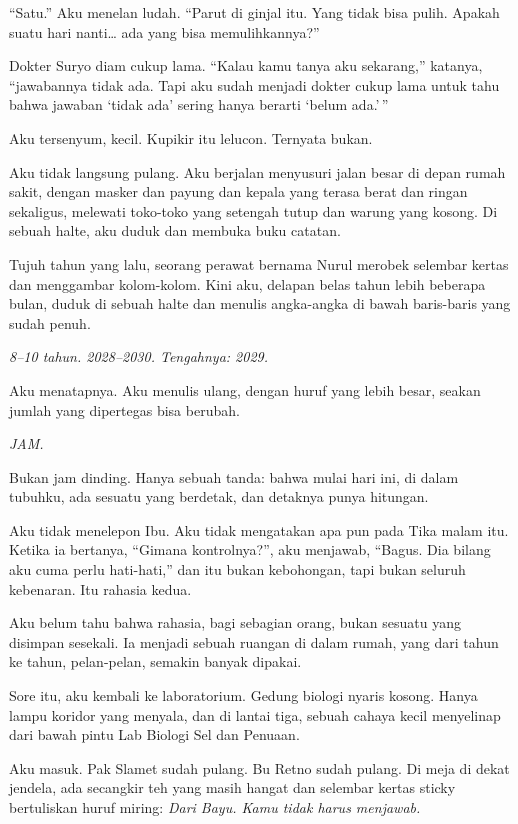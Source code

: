 \documentclass[11pt,twoside,openany]{book}
\makeatletter
\newcommand{\scenebreak}{\par\vspace{0.9em}{\centering\textsc{*\hspace{0.7em}*\hspace{0.7em}*}\par}\vspace{0.9em}\@afterindentfalse\@afterheading}
\makeatother
\begin{document}
``Satu.'' Aku menelan ludah. ``Parut di ginjal itu. Yang tidak bisa pulih. Apakah suatu hari nanti\ldots{} ada yang bisa memulihkannya?''

Dokter Suryo diam cukup lama. ``Kalau kamu tanya aku sekarang,'' katanya, ``jawabannya tidak ada. Tapi aku sudah menjadi dokter cukup lama untuk tahu bahwa jawaban `tidak ada' sering hanya berarti `belum ada.'\,''

Aku tersenyum, kecil. Kupikir itu lelucon. Ternyata bukan.

\scenebreak
Aku tidak langsung pulang. Aku berjalan menyusuri jalan besar di depan rumah sakit, dengan masker dan payung dan kepala yang terasa berat dan ringan sekaligus, melewati toko-toko yang setengah tutup dan warung yang kosong. Di sebuah halte, aku duduk dan membuka buku catatan.

Tujuh tahun yang lalu, seorang perawat bernama Nurul merobek selembar kertas dan menggambar kolom-kolom. Kini aku, delapan belas tahun lebih beberapa bulan, duduk di sebuah halte dan menulis angka-angka di bawah baris-baris yang sudah penuh.

\emph{8--10 tahun. 2028--2030. Tengahnya: 2029.}

Aku menatapnya. Aku menulis ulang, dengan huruf yang lebih besar, seakan jumlah yang dipertegas bisa berubah.

\emph{JAM.}

Bukan jam dinding. Hanya sebuah tanda: bahwa mulai hari ini, di dalam tubuhku, ada sesuatu yang berdetak, dan detaknya punya hitungan.

Aku tidak menelepon Ibu. Aku tidak mengatakan apa pun pada Tika malam itu. Ketika ia bertanya, ``Gimana kontrolnya?'', aku menjawab, ``Bagus. Dia bilang aku cuma perlu hati-hati,'' dan itu bukan kebohongan, tapi bukan seluruh kebenaran. Itu rahasia kedua.

Aku belum tahu bahwa rahasia, bagi sebagian orang, bukan sesuatu yang disimpan sesekali. Ia menjadi sebuah ruangan di dalam rumah, yang dari tahun ke tahun, pelan-pelan, semakin banyak dipakai.

\scenebreak
Sore itu, aku kembali ke laboratorium. Gedung biologi nyaris kosong. Hanya lampu koridor yang menyala, dan di lantai tiga, sebuah cahaya kecil menyelinap dari bawah pintu Lab Biologi Sel dan Penuaan.

Aku masuk. Pak Slamet sudah pulang. Bu Retno sudah pulang. Di meja di dekat jendela, ada secangkir teh yang masih hangat dan selembar kertas sticky bertuliskan huruf miring: \emph{Dari Bayu. Kamu tidak harus menjawab.}
\end{document}
